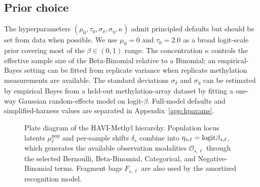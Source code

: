 \subsection{Prior choice}
The hyperparameters $(\mu_0,\tau_0,\sigma_\delta,\sigma_\eta,\kappa)$ admit principled defaults but should be set from data when possible. We use $\mu_0=0$ and $\tau_0=2.0$ as a broad logit-scale prior covering most of the $\beta\in(0,1)$ range. The concentration $\kappa$ controls the effective sample size of the Beta-Binomial relative to a Binomial; an empirical-Bayes setting can be fitted from replicate variance when replicate methylation measurements are available. The standard deviations $\sigma_\delta$ and $\sigma_\eta$ can be estimated by empirical Bayes from a held-out methylation-array dataset by fitting a one-way Gaussian random-effects model on logit-$\beta$. Full-model defaults and simplified-harness values are separated in Appendix~\ref{app:hparams}.


\begin{figure}[htbp]
\centering
{}
\caption{Plate diagram of the HAVI-Methyl hierarchy. Population locus latents $\mu^{\mathrm{pop}}_\ell$ and per-sample shifts $\delta_s$ combine into $\eta_{s,\ell}=\mathrm{logit}\beta_{s,\ell}$, which generates the available observation modalities $\mathcal{O}_{s,\ell}$ through the selected Bernoulli, Beta-Binomial, Categorical, and Negative-Binomial terms. Fragment bags $F_{s,\ell}$ are also used by the amortized recognition model.}
\label{fig:plate}
\end{figure}


